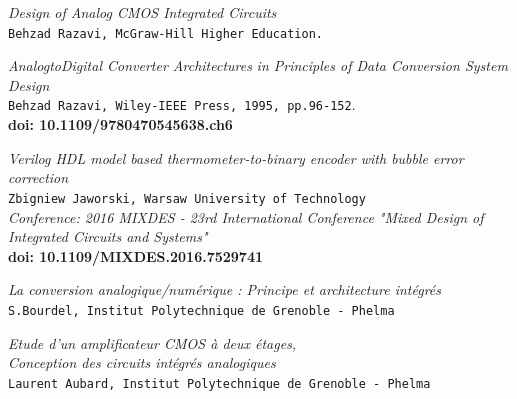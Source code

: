 \documentclass[11pt]{article}
\begin{document}
\begin{thebibliography}{9}
\textit{Design of Analog CMOS Integrated Circuits}
\\\texttt{Behzad Razavi, McGraw-Hill Higher Education.}

\textit{AnalogtoDigital Converter Architectures}
\textit{in Principles of Data Conversion System Design}\\
\texttt{Behzad Razavi, Wiley-IEEE Press, 1995, pp.96-152}.\\
\textbf{doi: 10.1109/9780470545638.ch6}

\textit{Verilog HDL model based thermometer-to-binary encoder with bubble error correction}\\
\texttt{Zbigniew Jaworski, Warsaw University of Technology}\\
\textit{Conference: 2016 MIXDES - 23rd International Conference "Mixed Design of Integrated Circuits and Systems"}\\
\textbf{doi: 10.1109/MIXDES.2016.7529741}

\textit{La conversion analogique/num\'erique : Principe et architecture int\'egr\'es}\\
\texttt{S.Bourdel, Institut Polytechnique de Grenoble - Phelma}

\textit{Etude d'un amplificateur CMOS \`a deux \'etages,}\\
\textit{Conception des circuits int\'egr\'es analogiques}\\
\texttt{Laurent Aubard, Institut Polytechnique de Grenoble - Phelma}

\end{thebibliography}
\end{document}
